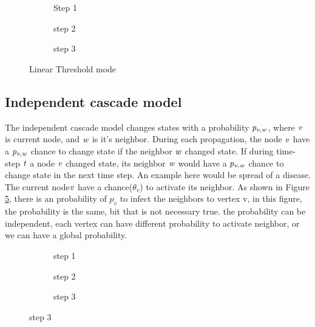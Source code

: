 {\begin{figure}[!ht]
	\begin{subfigure}
		\texttt{[image: linearThreshold]}
		\caption{Step 1 } 
		\label{fig:linearThresh}
	\end{subfigure}
	\begin{subfigure}
		\texttt{[image: linearThreshold2]}
		\caption{step 2 } 
		\label{fig:linearThresh2}
	\end{subfigure}
	\begin{subfigure}
		\texttt{[image: linearThreshold3]}
		\caption{step 3} 
		\label{fig:linearThresh3}
	\end{subfigure}
	\caption{Linear Threshold mode}
\end{figure}

\subsection{Independent cascade model}
The independent cascade model changes states with a probability $\it{p_{v, w}}$, where $\it{ v }$ is current node, and $\it{w}$ is it's neighbor. During each propagation, the node $\it{v}$ have a  $\it{p_{v, w}}$ chance to change state if the neighbor $\it{w}$ changed state. If during time-step $\it{t}$ a node $\it{v}$ changed state, its neighbor $\it{w}$ would have a $\it{p_{v, w}}$ chance to change state in the next time step. An example here would be spread of a disease. The current node$\it{v}$ have a chance($\theta_v$) to activate its neighbor. As shown in Figure \ref{fig:ICM}, there is an probability of $p_v$ to infect the neighbors to vertex v, in this figure, the probability is the same, bit that is not necessary true. the probability can be independent, each vertex can have different probability to activate neighbor, or we can have a global probability.

\begin{figure}[!ht]
	\begin{subfigure}
		\texttt{[image: ICM]}
		\caption{step 1 } 
		\label{fig:ICM}
	\end{subfigure}

	\begin{subfigure}
		\texttt{[image: ICM2]}
		\caption{step 2} 
		\label{fig:ICM2}
	\end{subfigure}

	\begin{subfigure}
		\texttt{[image: ICM3]}
		\caption{step 3} 
		\label{fig:ICM3}
	\end{subfigure}


\end{figure}}
